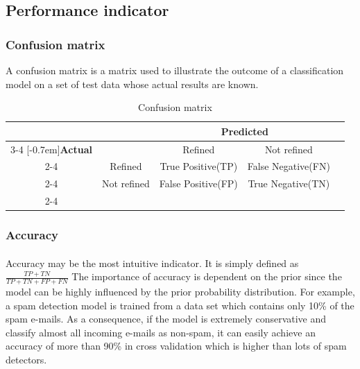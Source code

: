 
\subsection{Performance indicator}
\subsubsection{Confusion matrix}
A confusion matrix is a matrix used to illustrate the outcome of a classification model on a set of test data whose actual results are known.
    \begin{table}[]
        \centering
        \caption{Confusion matrix}
        \label{my-label}
        \begin{tabular}{ccccc}
                                & & \multicolumn{2}{c}{\textbf{Predicted}}                 &  \\ \cline{3-4}
                                \multirow{3}{*}[-0.7em]{\textbf{Actual}} &
                                & \multicolumn{1}{|c|}{Refined}        & \multicolumn{1}{c|}{Not refined}    &  \\ \cline{2-4}        
                                & \multicolumn{1}{|c}{Refined}     & \multicolumn{1}{|c|}{True Positive(TP)}  & \multicolumn{1}{c|}{False Negative(FN)} &  \\ \cline{2-4}
                                & \multicolumn{1}{|c}{Not refined} & \multicolumn{1}{|c|}{False Positive(FP)} & \multicolumn{1}{c|}{True Negative(TN)}  &  \\ \cline{2-4}
        \end{tabular}
    \end{table}
%
\subsubsection{Accuracy}
\paragraph{}
Accuracy may be the most intuitive indicator.
It is simply defined as $\frac{TP+TN}{TP+TN+FP+FN}$
The importance of accuracy is dependent on the prior since the model can be highly influenced by the prior probability distribution.
For example, a spam detection model is trained from a data set which contains only 10\% of the spam e-mails.
As a consequence, if the model is extremely conservative and classify almost all incoming e-mails as non-spam, it can easily achieve an accuracy of more than 90\% in cross validation which is higher than lots of spam detectors.

